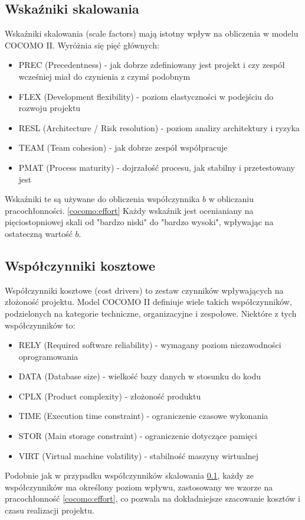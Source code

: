 \subsection{Wskaźniki skalowania}
\label{cocomo:scalefactors}
Wskaźniki skalowania (scale factors) mają istotny wpływ na obliczenia w modelu COCOMO II. Wyróżnia się pięć głównych:
\begin{itemize}
    \item PREC (Precedentness) - jak dobrze zdefiniowany jest projekt i czy zespół wcześniej miał do czynienia z czymś podobnym
    \item FLEX (Development flexibility) - poziom elastyczności w podejściu do rozwoju projektu
    \item RESL (Architecture / Risk resolution) - poziom analizy architektury i ryzyka
    \item TEAM (Team cohesion) - jak dobrze zespół współpracuje
    \item PMAT (Process maturity) - dojrzałość procesu, jak stabilny i przetestowany jest
\end{itemize}
Wskaźniki te są używane do obliczenia współczynnika $b$ w obliczaniu pracochłonności. \ref{cocomo:effort} Każdy wskaźnik jest ocenianiany na pięciostopniowej skali od "bardzo niski" do "bardzo wysoki",
wpływając na ostateczną wartość $b$.

\subsection{Współczynniki kosztowe}
Współczynniki kosztowe (cost drivers) to zestaw czynników wpływających na złożoność projektu. Model COCOMO II definiuje wiele takich współczynników, podzielonych na kategorie techniczne, organizacyjne i zespołowe. Niektóre z tych współczynników to:
\begin{itemize}
    \item RELY (Required software reliability) - wymagany poziom niezawodności oprogramowania
    \item DATA (Database size) - wielkość bazy danych w stosunku do kodu
    \item CPLX (Product complexity) - złożoność produktu
    \item TIME (Execution time constraint) - ograniczenie czasowe wykonania
    \item STOR (Main storage constraint) - ograniczenie dotyczące pamięci
    \item VIRT (Virtual machine volatility) - stabilność maszyny wirtualnej
\end{itemize}
Podobnie jak w przypadku współczynników skalowania \ref{cocomo:scalefactors}, każdy ze współczynników ma określony poziom wpływu, zastosowany we wzorze na pracochłonność \ref{cocomo:effort}, co pozwala
na dokładniejsze szacowanie kosztów i czasu realizacji projektu.
